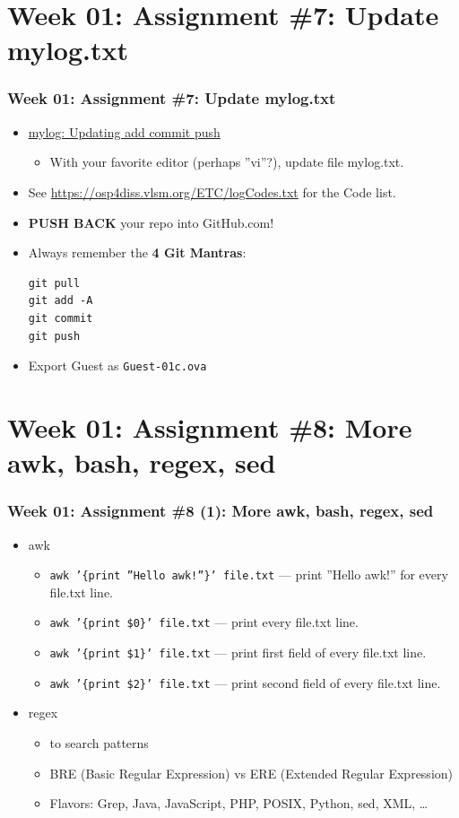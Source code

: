 \documentclass[xcolor=table, notheorems, hyperref={pdfpagelabels=false}]{beamer}
\begin{document}
\section{Week 01: Assignment \#7: Update mylog.txt}
\begin{frame}[fragile]
\frametitle{Week 01: Assignment \#7: Update mylog.txt}
\begin{itemize}
\item \href{https://osp4diss.vlsm.org/osp-114.html}{mylog: Updating add commit push}
\begin{itemize}
\item With your favorite editor (perhaps ''vi''?), update file mylog.txt.
\end{itemize}
\item See \url{https://osp4diss.vlsm.org/ETC/logCodes.txt} for the Code list.
\item \textbf{PUSH BACK} your repo into GitHub.com!
\item Always remember the \textbf{4 Git Mantras}:
\begin{lstlisting}[basicstyle=\ttfamily\footnotesize]
git pull
git add -A
git commit
git push
\end{lstlisting}
\item Export Guest as \texttt{Guest-01c.ova}
\end{itemize}
\end{frame}

\section{Week 01: Assignment \#8: More awk, bash, regex, sed}
\begin{frame}[fragile]
\frametitle{Week 01: Assignment \#8 (1): More awk, bash, regex, sed}
\begin{itemize}
\item awk
\begin{itemize}
\item \texttt{awk '\{print ''Hello awk!''\}' file.txt} --- print ''Hello awk!'' for every file.txt line.
\item \texttt{awk '\{print \$0\}' file.txt} --- print every file.txt line.
\item \texttt{awk '\{print \$1\}' file.txt} --- print first field of every file.txt line.
\item \texttt{awk '\{print \$2\}' file.txt} --- print second field of every file.txt line.
\end{itemize}
\item regex
\begin{itemize}
\item to search patterns
\item BRE (Basic Regular Expression) vs ERE (Extended Regular Expression)
\item Flavors: Grep, Java, JavaScript, PHP, POSIX, Python, sed, XML, \ldots
\end{itemize}
\end{itemize}
\end{frame}
\end{document}
